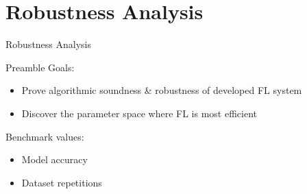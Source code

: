 \setlength{\parskip}{\baselineskip}
\section{Robustness Analysis}

\begin{frame}
	\huge Robustness Analysis
\end{frame}

\begin{frame}{Preamble}
	Goals:\\
	\begin{itemize}
	    \item Prove algorithmic soundness \& robustness of developed FL system
	    \item Discover the parameter space where FL is most efficient
	\end{itemize}
	
	Benchmark values:\\
	\begin{itemize}
	    \item Model accuracy
	    \item Dataset repetitions
	\end{itemize}
\end{frame}

                    
